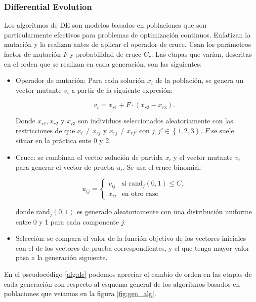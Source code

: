 \subsubsection{Differential Evolution}


Los algoritmos de DE \cite{diffev} son modelos basados en poblaciones que son particularmente efectivos para problemas de optimización continuos. Enfatizan la mutación y la realizan antes de aplicar el operador de cruce. Usan los parámetros factor de mutación $F$ y probabilidad de cruce $C_r$. Las etapas que varían, descritas en el orden que se realizan en cada generación, son las siguientes:

\begin{itemize}
	\item{Operador de mutación: Para cada solución $x_i$ de la población, se genera un vector mutante $v_i$ a partir de la siguiente expresión:
	
	$$v_i = x_{r1} + F \cdot (x_{r2} - x_{r3}).$$
	
	Donde $x_{r1}, x_{r2}$ y $x_{r3}$ son individuos seleccionados aleatoriamente con las restricciones de que $x_i  \neq x_{rj}$ y $x_{rj} \neq x_{rj'}$ con $j, j' \in \left \{ 1,2,3 \right \}$. $F$ se suele situar en la práctica ente 0 y 2.		
	}
	
	\item{Cruce: se combinan el vector solución de partida $x_i$ y el vector mutante $v_i$ para generar el vector de prueba $u_i$. Se usa el cruce binomial:
	
	$$u_{ij} = \begin{cases}
		v_{ij} & \text{si } \text{rand}_j(0,1) \leq C_r \\
		x_{ij} & \text{en otro caso}
		\end{cases} $$
		
		donde $\text{rand}_j(0,1)$ es generado aleatoriamente con una distribución uniforme entre 0 y 1 para cada componente $j$.	
	}
	
	\item{Selección: se compara el valor de la función objetivo de los vectores iniciales con el de los vectores de prueba correspondientes, y el que tenga mayor valor pasa a la generación siguiente.}

\end{itemize}

En el pseudocódigo \ref{alg:de} podemos apreciar el cambio de orden en las etapas de cada generación con respecto al esquema general de los algoritmos basados en poblaciones que veíamos en la figura \ref{fig:gen_alg}.

